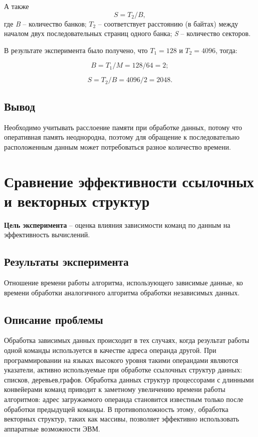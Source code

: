 А также
\begin{equation}
	S = T_2 / B,
\end{equation}
где \textit{B} -- количество банков; $T_2$ -- соответствует расстоянию (в
байтах) между началом двух последовательных страниц одного банка; \textit{S} --
количество секторов.

В результате эксперимента было получено, что $T_1 = 128$ и $T_2 = 4096$, тогда:

\begin{equation}
	B = T_1 / M = 128 / 64 = 2;
\end{equation}

\begin{equation}
	S = T_2 / B = 4096 / 2 = 2048.
\end{equation}


\subsection{Вывод}

Необходимо учитывать расслоение памяти при обработке данных, потому что
оперативная память неоднородна, поэтому для обращение к последовательно
расположенным данным может потребоваться разное количество времени.

\section{Сравнение эффективности ссылочных и векторных структур}

\textbf{Цель эксперимента} -- оценка   влияния   зависимости   команд   по   данным   на эффективность вычислений.

\subsection{Результаты эксперимента}
Отношение времени работы алгоритма, использующего зависимые данные, ко времени обработки аналогичного алгоритма обработки независимых данных.

\subsection{Описание проблемы}
Обработка зависимых данных происходит в тех случаях, когда результат работы одной команды используется в качестве адреса операнда другой. При программировании на языках высокого уровня такими операндами являются указатели, активно используемые при обработке ссылочных структур данных: списков, деревьев,графов. Обработка данных структур процессорами с длинными конвейерами команд приводит к заметному увеличению  времени работы алгоритмов: адрес загружаемого операнда   становится   известным   только   после   обработки   предыдущей   команды.   В противоположность этому, обработка векторных структур, таких как массивы, позволяет эффективно использовать аппаратные возможности ЭВМ.

